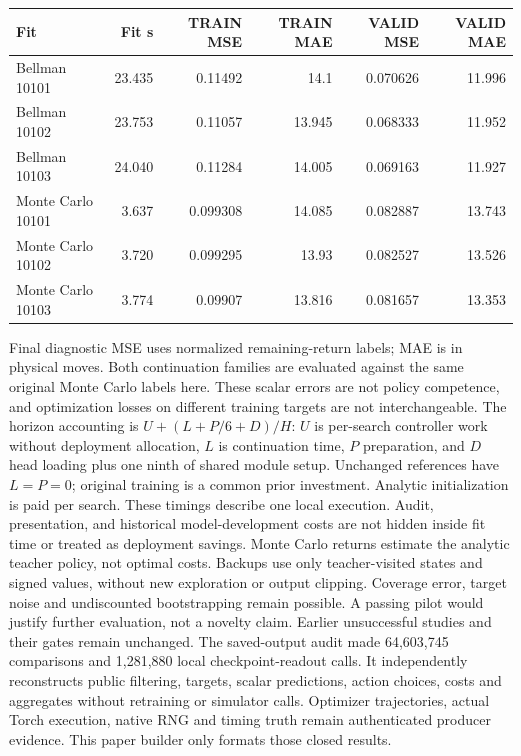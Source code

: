 \documentclass[10pt]{article}
\begin{document}
{\small\centering
\begin{tabular}{lrrrrr}
\toprule
Fit & Fit s & TRAIN MSE & TRAIN MAE & VALID MSE & VALID MAE \\ \midrule
Bellman 10101 & 23.435 & 0.11492 & 14.1 & 0.070626 & 11.996 \\
Bellman 10102 & 23.753 & 0.11057 & 13.945 & 0.068333 & 11.952 \\
Bellman 10103 & 24.040 & 0.11284 & 14.005 & 0.069163 & 11.927 \\
Monte Carlo 10101 & 3.637 & 0.099308 & 14.085 & 0.082887 & 13.743 \\
Monte Carlo 10102 & 3.720 & 0.099295 & 13.93 & 0.082527 & 13.526 \\
Monte Carlo 10103 & 3.774 & 0.09907 & 13.816 & 0.081657 & 13.353 \\
\bottomrule
\end{tabular}
\par}
Final diagnostic MSE uses normalized remaining-return labels; MAE is in physical moves. Both continuation families are evaluated against the same original Monte Carlo labels here. These scalar errors are not policy competence, and optimization losses on different training targets are not interchangeable.
The horizon accounting is $U+(L+P/6+D)/H$: $U$ is per-search controller work without deployment allocation, $L$ is continuation time, $P$ preparation, and $D$ head loading plus one ninth of shared module setup. Unchanged references have $L=P=0$; original training is a common prior investment. Analytic initialization is paid per search. These timings describe one local execution. Audit, presentation, and historical model-development costs are not hidden inside fit time or treated as deployment savings.
Monte Carlo returns estimate the analytic teacher policy, not optimal costs. Backups use only teacher-visited states and signed values, without new exploration or output clipping. Coverage error, target noise and undiscounted bootstrapping remain possible. A passing pilot would justify further evaluation, not a novelty claim. Earlier unsuccessful studies and their gates remain unchanged.
The saved-output audit made 64,603,745 comparisons and 1,281,880 local checkpoint-readout calls. It independently reconstructs public filtering, targets, scalar predictions, action choices, costs and aggregates without retraining or simulator calls. Optimizer trajectories, actual Torch execution, native RNG and timing truth remain authenticated producer evidence. This paper builder only formats those closed results.
\end{document}
